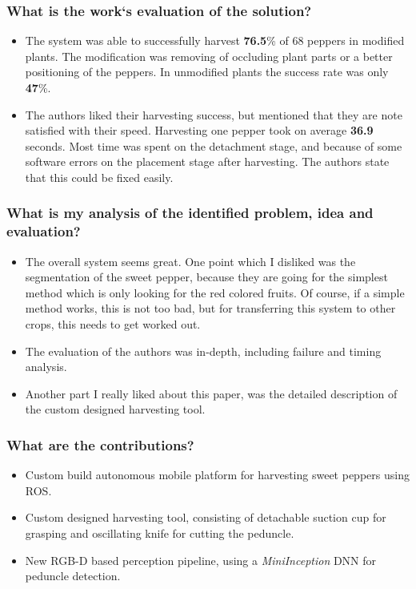     \subsubsection*{What is the work`s evaluation of the solution?}
    \begin{itemize}
        \item The system was able to successfully harvest \textbf{76.5}\% of 68 peppers in modified plants. The modification was removing of occluding plant parts or a better positioning of the peppers. In unmodified plants the success rate was only \textbf{47}\%.
        \item The authors liked their harvesting success, but mentioned that they are note satisfied with their speed. Harvesting one pepper took on average \textbf{36.9} seconds. Most time was spent on the detachment stage, and because of some software errors on the placement stage after harvesting. The authors state that this could be fixed easily.
    \end{itemize}
    \subsubsection*{What is my analysis of the identified problem, idea and evaluation?}
    \begin{itemize}
        \item The overall system seems great. One point which I disliked was the segmentation of the sweet pepper, because they are going for the simplest method which is only looking for the red colored fruits. Of course, if a simple method works, this is not too bad, but for transferring this system to other crops, this needs to get worked out.
        \item The evaluation of the authors was in-depth, including failure and timing analysis.
        \item Another part I really liked about this paper, was the detailed description of the custom designed harvesting tool.
    \end{itemize}
    \subsubsection*{What are the contributions?}
    \begin{itemize}
        \item Custom build autonomous mobile platform for harvesting sweet peppers using ROS.
        \item Custom designed harvesting tool, consisting of detachable suction cup for grasping and oscillating knife for cutting the peduncle.
        \item New RGB-D based perception pipeline, using a \emph{MiniInception} DNN for peduncle detection.
    \end{itemize}
